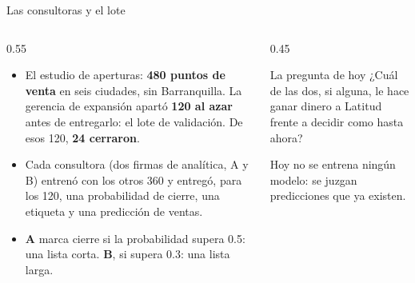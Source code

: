 \documentclass{beamer}
\begin{document}
\begin{frame}{Las consultoras y el lote}
\begin{columns}[T]
\begin{column}{0.55\textwidth}
\begin{itemize}\itemsep5pt
  \item El estudio de aperturas: \textbf{480 puntos de venta} en seis ciudades, sin Barranquilla. La gerencia de expansión apartó \textbf{120 al azar} antes de entregarlo: el lote de validación. De esos 120, \textbf{24 cerraron}.
  \item Cada consultora (dos firmas de analítica, A y B) entrenó con los otros 360 y entregó, para los 120, una probabilidad de cierre, una etiqueta y una predicción de ventas.
  \item \textbf{A} marca cierre si la probabilidad supera 0.5: una lista corta. \textbf{B}, si supera 0.3: una lista larga.
\end{itemize}
\end{column}
\begin{column}{0.45\textwidth}
\begin{block}{La pregunta de hoy}
¿Cuál de las dos, si alguna, le hace ganar dinero a Latitud frente a decidir como hasta ahora?
\end{block}
\medskip
\small Hoy no se entrena ningún modelo: se juzgan predicciones que ya existen.
\end{column}
\end{columns}
\end{frame}
\end{document}
